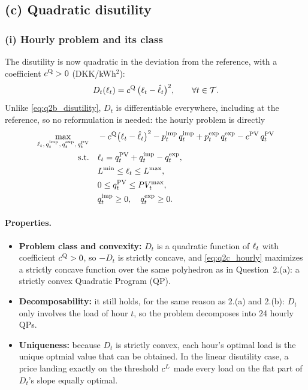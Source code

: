 
\subsection{(c) Quadratic disutility}

\subsubsection{(i) Hourly problem and its class}

The disutility is now quadratic in the deviation from the reference, with a coefficient
$c^{\mathrm{Q}} > 0$ (DKK/kWh$^2$):
\begin{equation}
    D_t(\ell_{t}) = c^{\mathrm{Q}} \, \big( \ell_{t} - \hat{\ell}_{t} \big)^2, \qquad \forall t \in \mathcal{T}.
    \label{eq:q2c_disutility}
\end{equation}
Unlike \eqref{eq:q2b_disutility}, $D_t$ is differentiable everywhere, including at the
reference, so no reformulation is needed: the hourly problem is directly
\begin{align}
    \max_{\ell_{t},\, q^{\mathrm{imp}}_{t},\, q^{\mathrm{exp}}_{t},\, q^{\mathrm{PV}}_{t}} \quad
    & - c^{\mathrm{Q}} \big( \ell_{t} - \hat{\ell}_{t} \big)^2 - p^{\mathrm{imp}}_{t} \, q^{\mathrm{imp}}_{t} + p^{\mathrm{exp}}_{t} \, q^{\mathrm{exp}}_{t} - c^{\mathrm{PV}} \, q^{\mathrm{PV}}_{t}
    \label{eq:q2c_hourly} \\
    \text{s.t.} \quad
    & \ell_{t} = q^{\mathrm{PV}}_{t} + q^{\mathrm{imp}}_{t} - q^{\mathrm{exp}}_{t}, \nonumber \\
    & L^{\min} \leq \ell_{t} \leq L^{\max}, \nonumber \\
    & 0 \leq q^{\mathrm{PV}}_{t} \leq PV_{t}^{\max}, \nonumber \\
    & q^{\mathrm{imp}}_{t} \geq 0, \quad q^{\mathrm{exp}}_{t} \geq 0. \nonumber
\end{align}

\paragraph{Properties.}
\begin{itemize}
    \item \textbf{Problem class and convexity:} $D_t$ is a quadratic function of $\ell_{t}$ with
    coefficient $c^{\mathrm{Q}} > 0$, so $-D_t$ is strictly concave, and \eqref{eq:q2c_hourly} maximizes a
    strictly concave function over the same polyhedron as in Question~2.(a): a strictly convex
    Quadratic Program (QP).
    \item \textbf{Decomposability:} it still holds, for the same reason as 2.(a) and 2.(b):
    $D_t$ only involves the load of hour $t$, so the problem decomposes into 24 hourly QPs.
    \item \textbf{Uniqueness:} because $D_t$ is strictly convex, each hour's optimal load is the unique optmial value that can be obtained. In the linear disutility case, a price landing exactly on the threshold $c^{L}$ made every load on the flat part of $D_t$'s slope equally optimal.
\end{itemize}


